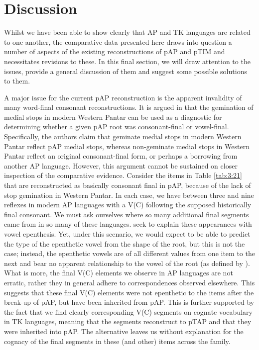 \section{Discussion}\label{sec:3:4}
Whilst we have been able to show clearly that AP and TK languages are related to one another, the comparative data presented here draws into question a number of aspects of the existing reconstructions of pAP and pTIM and necessitates revisions to these. In this final section, we will draw attention to the issues, provide a general discussion of them and suggest some possible solutions to them. 

A major issue for the current pAP reconstruction is the apparent invalidity of many word-final consonant reconstructions. It is argued in \citet[95]{HoltonEtAl2012} that the gemination of medial stops in modern Western Pantar can be used as a diagnostic for determining whether a given pAP root was consonant-final or vowel-final. Specifically, the authors claim that geminate medial stops in modern Western Pantar reflect pAP medial stops, whereas non-geminate medial stops in Western Pantar reflect an original consonant-final form, or perhaps a borrowing from another AP language. However, this argument cannot be sustained on closer inspection of the comparative evidence. Consider the items in Table \ref{tab:3:21} that are reconstructed as basically consonant final in pAP, because of the lack of stop gemination in Western Pantar. In each case, we have between three and nine reflexes in modern AP languages with a V(C) following the supposed historically final consonant. We must ask ourselves where so many additional final segments came from in so many of these languages. \citet{HoltonEtAl2012} seek to explain these appearances with vowel epenthesis. Yet, under this scenario, we would expect to be able to predict the type of the epenthetic vowel from the shape of the root, but this is not the case; instead, the epenthetic vowels are of all different values from one item to the next and bear no apparent relationship to the vowel of the root (as defined by \citealt{HoltonEtAl2012}). What is more, the final V(C) elements we observe in AP languages are not erratic, rather they in general adhere to correspondences observed elsewhere. This suggests that these final V(C) elements were not epenthetic to the items after the break-up of pAP, but have been inherited from pAP. This is further supported by the fact that we find clearly corresponding V(C) segments on cognate vocabulary in TK languages, meaning that the segments reconstruct to pTAP and that they were inherited into pAP. The alternative leaves us without explanation for the cognacy of the final segments in these (and other) items across the family. 
 

